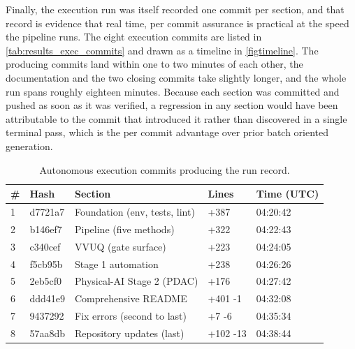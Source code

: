 Finally, the execution run was itself recorded one commit per section, and that
record is evidence that real time, per commit assurance is practical at the speed
the pipeline runs. The eight execution commits are listed in
\autoref{tab:results_exec_commits} and drawn as a timeline in
\autoref{figtimeline}. The producing commits land within one to two minutes of
each other, the documentation and the two closing commits take slightly longer,
and the whole run spans roughly eighteen minutes. Because each section was
committed and pushed as soon as it was verified, a regression in any section would
have been attributable to the commit that introduced it rather than discovered in
a single terminal pass, which is the per commit advantage over prior batch
oriented generation.

\begin{table}[H]
\caption{Autonomous execution commits producing the run record.}
\label{tab:results_exec_commits}
\centering
\begin{tabularx}{\textwidth}{C{0.6cm} L{1.9cm} >{\raggedright\arraybackslash}X C{1.7cm} C{2.0cm}}
\toprule
\textbf{\#} & \textbf{Hash} & \textbf{Section} & \textbf{Lines} & \textbf{Time (UTC)} \\
 & d7721a7 & Foundation (env, tests, lint)  & +387     & 04:20:42 \\
  2 & b146ef7 & Pipeline (five methods)        & +322     & 04:22:43 \\
  3 & c340cef & VVUQ (gate surface)            & +223     & 04:24:05 \\
  4 & f5cb95b & Stage 1 automation             & +238     & 04:26:26 \\
  5 & 2eb5cf0 & Physical-AI Stage 2 (PDAC)     & +176     & 04:27:42 \\
  6 & ddd41e9 & Comprehensive README           & +401 -1  & 04:32:08 \\
  7 & 9437292 & Fix errors (second to last)    & +7 -6    & 04:35:34 \\
  8 & 57aa8db & Repository updates (last)      & +102 -13 & 04:38:44 \\
\bottomrule
\end{tabularx}
\end{table}

